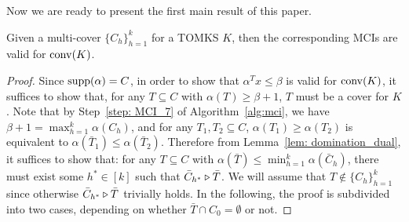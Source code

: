 Now we are ready to present the first main result of this paper.



\begin{theorem}
\label{theo: MCI_antichain}
Given a multi-cover $\{C_h\}_{h=1}^k$ for a TOMKS $K$, then the corresponding MCIs are valid for $\operatorname{conv}(K)$. 
\end{theorem}

\begin{proof}
Since $\operatorname{supp}(\alpha) = C$, in order to show that $\alpha^T x \leq \beta$ is valid for $\operatorname{conv}(K)$, it suffices to show that, for any $T \subseteq C$ with $\alpha(T) \geq \beta + 1$, $T$ must be a cover for $K$. Note that by Step~\ref{step: MCI_7} of Algorithm~\ref{alg:mci}, we have $\beta + 1= \max_{h=1}^k \alpha(C_h)$, 
and for any $T_1, T_2 \subseteq C$, $\alpha(T_1) \geq \alpha(T_2)$ is equivalent to $\alpha(\bar T_1) \leq \alpha(\bar T_2)$.
Therefore from Lemma~\ref{lem: domination_dual}, it suffices to show that: for any $T \subseteq C$ with $\alpha(\bar T) \leq \min_{h=1}^k\alpha(\bar C_h)$, there must exist some $h^* \in [k]$ such that $\bar C_{h^*} \triangleright \bar T$. We will assume that $T \notin \{C_h\}_{h=1}^k$ since otherwise $\bar C_{h^*} \triangleright \bar T$ trivially holds. 
In the following, the proof is subdivided into two cases, depending on whether $\bar T \cap C_0 = \emptyset$ or not.

\smallskip


\end{proof}
